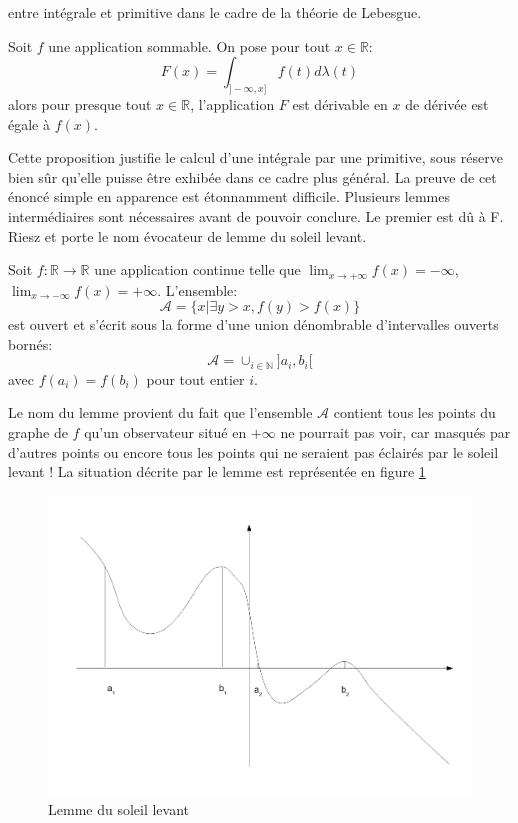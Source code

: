 entre intégrale et primitive dans le cadre de la théorie de Lebesgue.
\begin{mandatory}
\begin{theorem}\label{thm:derivee_integrale}
Soit $f$ une application sommable. On pose pour tout $x \in \mathbb{R}$:
\[
F(x) = \int_{]-\infty,x]} f(t) d \lambda(t)
\]
alors pour presque tout $x \in \mathbb{R}$, l'application $F$ est dérivable en
$x$ de dérivée est égale à $f(x)$.
\end{theorem}
\end{mandatory}
Cette proposition justifie le calcul d'une intégrale par une primitive, sous
réserve bien sûr qu'elle puisse être exhibée dans ce cadre plus général. La
preuve de cet énoncé simple en apparence est étonnamment difficile. Plusieurs
lemmes intermédiaires sont nécessaires avant de pouvoir conclure. Le premier est
dû à F. Riesz et porte le nom évocateur de lemme du soleil levant.
\begin{lemme}\label{lem:soleil_levant}
Soit $f : \mathbb{R} \to \mathbb{R}$ une application continue telle que
$\lim_{x \to +\infty} f(x) = - \infty$, $\lim_{x \to -\infty} f(x) = +\infty$.
L'ensemble:
\[
\mathcal{A} = \{ x | \exists y > x , f(y) > f(x) \}
\]
est ouvert et s'écrit sous la forme d'une union dénombrable d'intervalles
ouverts bornés:
\[
\mathcal{A} = \cup_{i \in \mathbb{N}} ]a_i,b_i[
\]
avec $f(a_i)=f(b_i)$ pour tout entier $i$.
\end{lemme}
Le nom du lemme provient du fait que l'ensemble $\mathcal{A}$ contient tous les
points du graphe de $f$ qu'un observateur situé en $+\infty$ ne pourrait pas
voir, car masqués par d'autres points ou encore tous les points qui ne seraient
pas éclairés par le soleil levant ! La situation décrite par le lemme est
représentée en figure \ref{fig:rising_sun}

\begin{center}
\begin{figure}[ht]
\includegraphics[scale=0.3]{images/rising_sun.pdf}
\caption{Lemme du soleil levant}\label{fig:rising_sun}
\end{figure}
\end{center}

